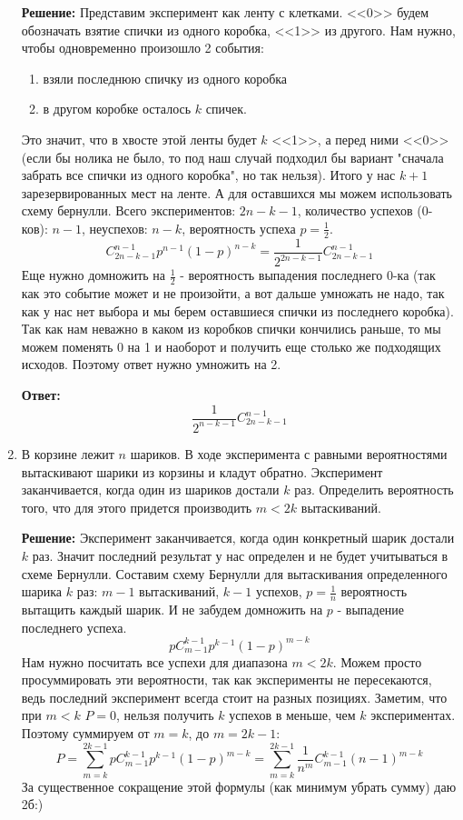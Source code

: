 \documentclass[a4paper, 14pt]{extarticle}
\begin{document}
\begin{enumerate}
\textbf{Решение:}
Представим эксперимент как ленту с клетками. <<0>> будем обозначать взятие спички из одного коробка, <<1>> из другого. Нам нужно, чтобы одновременно произошло 2 события: \begin{enumerate} 
\item взяли последнюю спичку из одного коробка
\item в другом коробке осталось $k$ спичек.
\end{enumerate} 
Это значит, что в хвосте этой ленты будет $k$ <<1>>, а перед ними <<0>> (если бы нолика не было, то под наш случай подходил бы вариант "сначала забрать все спички из одного коробка", но так нельзя). 
Итого у нас $k+1$ зарезервированных мест на ленте. А для оставшихся мы можем использовать схему бернулли. \newline
Всего экспериментов: $2n - k - 1$, количество успехов (0-ков): $n-1$, неуспехов: $n-k$, вероятность успеха $p=\frac{1}{2}$.  
$$C_{2n-k-1}^{n-1}p^{n-1}(1-p)^{n-k} = \frac{1}{2^{2n-k-1}}C_{2n-k-1}^{n-1}$$
Еще нужно домножить на $\frac{1}{2}$ - вероятность выпадения последнего 0-ка (так как это событие может и не произойти, а вот дальше умножать не надо, так как у нас нет выбора и мы берем оставшиеся спички из последнего коробка). \newline 
Так как нам неважно в каком из коробков спички кончились раньше, то мы можем поменять 0 на 1 и наоборот и получить еще столько же подходящих исходов. Поэтому ответ нужно умножить на 2.

\textbf{Ответ:}$$ \frac{1}{2^{n-k-1}}C_{2n-k-1}^{n-1}$$


\item В корзине лежит $n$ шариков. В ходе эксперимента с равными вероятностями вытаскивают шарики из корзины и кладут обратно. Эксперимент заканчивается, когда один из шариков достали $k$ раз. Определить вероятность того, что для этого
придется производить $m<2k$ вытаскиваний.

\textbf{Решение:}
Эксперимент заканчивается, когда один конкретный шарик достали $k$ раз. Значит последний результат у нас определен и не будет учитываться в схеме Бернулли. Составим схему Бернулли для вытаскивания определенного шарика $k$ раз: $m-1$ вытаскиваний, $k-1$ успехов, $p=\frac{1}{n}$ вероятность вытащить каждый шарик. И не забудем домножить на $p$ - выпадение последнего успеха.
$$pC_{m-1}^{k-1}p^{k-1}(1-p)^{m-k}$$
Нам нужно посчитать все успехи для диапазона $m<2k$. Можем просто просуммировать эти вероятности, так как эксперименты не пересекаются, ведь последний эксперимент всегда стоит на разных позициях. Заметим, что при $m<k$ $P=0$, нельзя получить $k$ успехов в меньше, чем $k$ экспериментах. Поэтому суммируем от $m=k$, до $m=2k-1$:
$$P = \sum_{m=k}^{2k-1} pC_{m-1}^{k-1}p^{k-1}(1-p)^{m-k} = \sum_{m=k}^{2k-1}\frac{1}{n^m}C_{m-1}^{k-1}(n-1)^{m-k}$$
За существенное сокращение этой формулы (как минимум убрать сумму) даю 2б:)
\end{enumerate}
\end{document}
